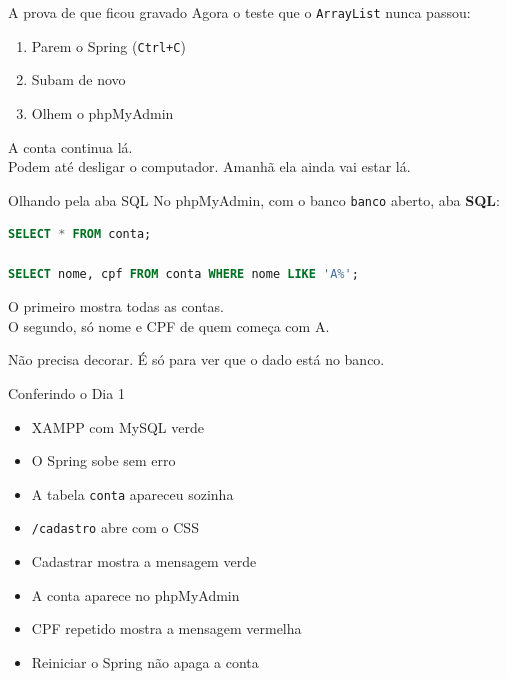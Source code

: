 \documentclass[aspectratio=169,11pt]{beamer}
\begin{document}
\begin{frame}{A prova de que ficou gravado}
  Agora o teste que o \texttt{ArrayList} nunca passou:

  \vspace{0.5em}
  \begin{enumerate}
    \item Parem o Spring (\texttt{Ctrl+C})
    \item Subam de novo
    \item Olhem o phpMyAdmin
  \end{enumerate}

  \vspace{0.5em}
  A conta continua lá.\\
  Podem até desligar o computador. Amanhã ela ainda vai estar lá.
\end{frame}

\begin{frame}[fragile]{Olhando pela aba SQL}
  No phpMyAdmin, com o banco \texttt{banco} aberto, aba \textbf{SQL}:

\begin{lstlisting}[language=SQL,basicstyle=\ttfamily\footnotesize]
SELECT * FROM conta;

SELECT nome, cpf FROM conta WHERE nome LIKE 'A%';
\end{lstlisting}

  \vspace{0.4em}
  O primeiro mostra todas as contas.\\
  O segundo, só nome e CPF de quem começa com A.

  \vspace{0.4em}
  Não precisa decorar. É só para ver que o dado está no banco.
\end{frame}

\begin{frame}{Conferindo o Dia 1}
  \begin{itemize}
    \item [ ] XAMPP com MySQL verde
    \item [ ] O Spring sobe sem erro
    \item [ ] A tabela \texttt{conta} apareceu sozinha
    \item [ ] \texttt{/cadastro} abre com o CSS
    \item [ ] Cadastrar mostra a mensagem verde
    \item [ ] A conta aparece no phpMyAdmin
    \item [ ] CPF repetido mostra a mensagem vermelha
    \item [ ] Reiniciar o Spring não apaga a conta
  \end{itemize}
\end{frame}
\end{document}
